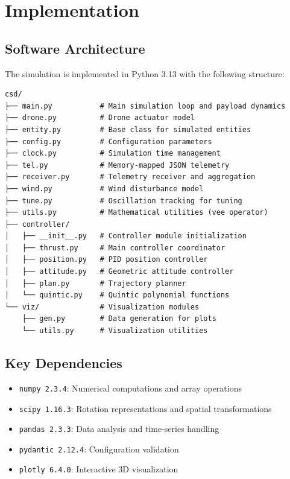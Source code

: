 \documentclass[12pt,a4paper]{article}
\begin{document}
\section{Implementation}
\label{sec:implementation}

\subsection{Software Architecture}

The simulation is implemented in Python 3.13 with the following structure:

\begin{verbatim}
csd/
├── main.py           # Main simulation loop and payload dynamics
├── drone.py          # Drone actuator model
├── entity.py         # Base class for simulated entities
├── config.py         # Configuration parameters
├── clock.py          # Simulation time management
├── tel.py            # Memory-mapped JSON telemetry
├── receiver.py       # Telemetry receiver and aggregation
├── wind.py           # Wind disturbance model
├── tune.py           # Oscillation tracking for tuning
├── utils.py          # Mathematical utilities (vee operator)
├── controller/
│   ├── __init__.py   # Controller module initialization
│   ├── thrust.py     # Main controller coordinator
│   ├── position.py   # PID position controller
│   ├── attitude.py   # Geometric attitude controller
│   ├── plan.py       # Trajectory planner
│   └── quintic.py    # Quintic polynomial functions
└── viz/              # Visualization modules
    ├── gen.py        # Data generation for plots
    └── utils.py      # Visualization utilities
\end{verbatim}

\subsection{Key Dependencies}

\begin{itemize}
    \item \texttt{numpy 2.3.4}: Numerical computations and array operations
    \item \texttt{scipy 1.16.3}: Rotation representations and spatial transformations
    \item \texttt{pandas 2.3.3}: Data analysis and time-series handling
    \item \texttt{pydantic 2.12.4}: Configuration validation
    \item \texttt{plotly 6.4.0}: Interactive 3D visualization
\end{itemize}
\end{document}
